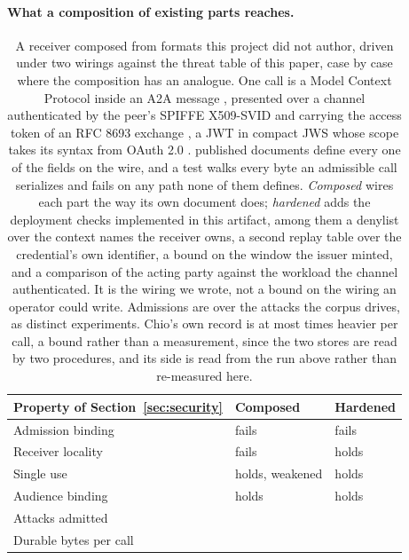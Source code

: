 \paragraph{What a composition of existing parts reaches.}
\begin{table}[!tb]
\centering
\small
\caption{A receiver composed from \PSBaseParts{} formats this project did not author, driven under two wirings against the threat table of this paper, case by case where the composition has an analogue. One call is a Model Context Protocol  \cite{mcp} inside an A2A message \cite{a2a}, presented over a channel authenticated by the peer's SPIFFE X509-SVID \cite{spiffe} and carrying the access token of an RFC 8693 exchange \cite{rfc8693}, a JWT \cite{rfc7519} in compact JWS \cite{rfc7515} whose scope takes its syntax from OAuth 2.0 \cite{rfc6749}. \PSBaseDocuments{} published documents define every one of the \PSBaseRequestFields{} fields on the wire, and a test walks every byte an admissible call serializes and fails on any path none of them defines. \emph{Composed} wires each part the way its own document does; \emph{hardened} adds the deployment checks implemented in this artifact, among them a denylist over the context names the receiver owns, a second replay table over the credential's own identifier, a bound on the window the issuer minted, and a comparison of the acting party against the workload the channel authenticated. It is the wiring we wrote, not a bound on the wiring an operator could write. Admissions are over the \PSBaseNegativeAttacks{} attacks the corpus drives, as \PSBaseNegativeDistinctDrives{} distinct experiments. Chio's own record is at most \PSBaseStorageRatioUpperBound{} times heavier per call, a bound rather than a measurement, since the two stores are read by two procedures, and its side is read from the run above rather than re-measured here.}
\label{tab:baseline}
\begin{tabular}{@{}lll@{}}
\toprule
Property of Section~\ref{sec:security} & Composed & Hardened \\
\midrule
Admission binding & fails & fails \\
Receiver locality & fails & holds \\
Single use & holds, weakened & holds \\
Audience binding & holds & holds \\
\midrule
Attacks admitted & \PSBaseComposedAdmits{} & \PSBaseHardenedAdmits{} \\
Durable bytes per call & \PSBaseBytesPerCall{} & \PSBaseHardenedBytesPerCall{} \\
\bottomrule
\end{tabular}
\end{table}

